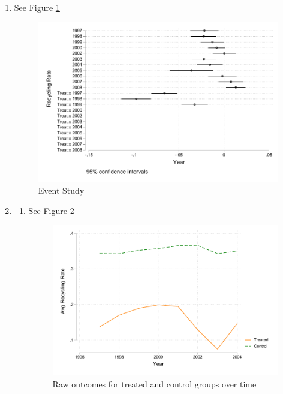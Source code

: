\documentclass{article}
\begin{document}
\begin{enumerate}
\item  See Figure \ref{fig:Q4}

\begin{figure}[htbp]
    \centering
    \includegraphics[width=\textwidth]{HW9Q4.pdf}
    \caption{Event Study}
    \label{fig:Q4}
\end{figure}

\item 

\begin {itemize}
\begin{enumerate}[label=\alph*)]
 \item See Figure \ref{fig:Q5a}
\begin{figure}[htbp]
    \centering
    \includegraphics[width=\textwidth]{HW9Q5a.pdf}
    \caption{Raw outcomes for treated and control groups over time}
    \label{fig:Q5a}
\end{figure}


\end{enumerate}
\end{itemize}
\end{enumerate}
\end{document}

